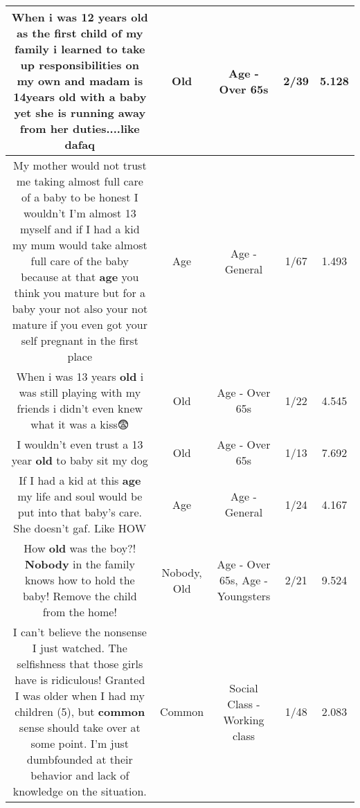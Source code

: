 \documentclass[11pt]{article}
\newlength\mylength
\begin{document}
\begin{center}
\begin{longtable}{|C{.65\mylength}|C{.30\mylength}|C{.12\mylength}|C{.12\mylength}|C{.12\mylength}|}
  \small When i was 12 years \textbf{old} as the first child of my family i learned to take up responsibilities on my own and madam is 14years \textbf{old} with a baby yet she is running away from her duties....like dafaq\normalsize   & Old & Age - Over 65s & 2/39 & 5.128 \\  \hline
  \small My mother would not trust me taking almost full care of a baby to be honest I wouldn't I'm almost 13 myself and if I had a kid my mum would take almost full care of the baby because at that \textbf{age} you think you mature but for a baby your not also your not mature if you even got your self pregnant in the first place\normalsize   & Age & Age - General & 1/67 & 1.493 \\  \hline
  \small When i was 13 years \textbf{old} i was still playing with my friends i didn't even knew what it was a kiss😨\normalsize   & Old & Age - Over 65s & 1/22 & 4.545 \\  \hline
  \small I wouldn't even trust a 13 year \textbf{old} to  baby sit my dog\normalsize   & Old & Age - Over 65s & 1/13 & 7.692 \\  \hline
  \small If I had a kid at this \textbf{age} my life and soul would be put into that baby's care. She doesn't gaf. Like HOW\normalsize   & Age & Age - General & 1/24 & 4.167 \\  \hline
  \small How \textbf{old} was the boy?!   \textbf{Nobody} in the family knows how to hold the baby! Remove the child from the home!\normalsize   & Nobody, Old & Age - Over 65s, Age - Youngsters & 2/21 & 9.524 \\  \hline
  \small I can't believe the nonsense I just watched. The selfishness that those girls have is ridiculous! Granted I was older when I had my children (5), but \textbf{common} sense should take over at some point. I'm just dumbfounded at their behavior and lack of knowledge on the situation.\normalsize   & Common & Social Class - Working class & 1/48 & 2.083 \\  \hline

\end{longtable}
\end{center}
\end{document}
